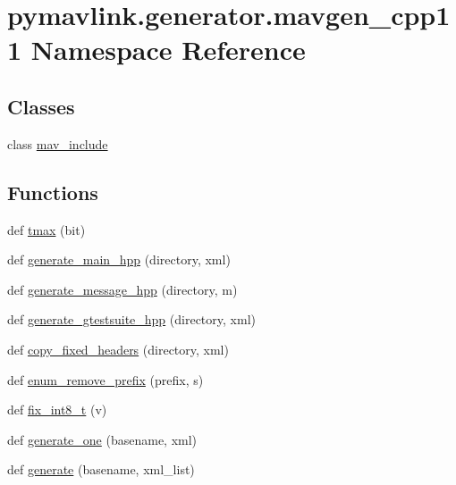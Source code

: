 \hypertarget{namespacepymavlink_1_1generator_1_1mavgen__cpp11}{}\section{pymavlink.\+generator.\+mavgen\+\_\+cpp11 Namespace Reference}
\label{namespacepymavlink_1_1generator_1_1mavgen__cpp11}
\subsection*{Classes}
\begin{DoxyCompactItemize}
\item 
class \mbox{\hyperlink{classpymavlink_1_1generator_1_1mavgen__cpp11_1_1mav__include}{mav\+\_\+include}}
\end{DoxyCompactItemize}
\subsection*{Functions}
\begin{DoxyCompactItemize}
\item 
def \mbox{\hyperlink{namespacepymavlink_1_1generator_1_1mavgen__cpp11_af2c11cc64c4dac58aa5a7dd8702a5edd}{tmax}} (bit)
\item 
def \mbox{\hyperlink{namespacepymavlink_1_1generator_1_1mavgen__cpp11_a8588e20abc9c34779923fda932483ace}{generate\+\_\+main\+\_\+hpp}} (directory, xml)
\item 
def \mbox{\hyperlink{namespacepymavlink_1_1generator_1_1mavgen__cpp11_a45ff369d71421e11a26c7a69c2f8de6c}{generate\+\_\+message\+\_\+hpp}} (directory, m)
\item 
def \mbox{\hyperlink{namespacepymavlink_1_1generator_1_1mavgen__cpp11_a1eb8c2ef48de5401c229cf9815761666}{generate\+\_\+gtestsuite\+\_\+hpp}} (directory, xml)
\item 
def \mbox{\hyperlink{namespacepymavlink_1_1generator_1_1mavgen__cpp11_a1780acf401220c5fc94513ec4e40fca4}{copy\+\_\+fixed\+\_\+headers}} (directory, xml)
\item 
def \mbox{\hyperlink{namespacepymavlink_1_1generator_1_1mavgen__cpp11_a62a78fb03297e16426b20e29b0f97332}{enum\+\_\+remove\+\_\+prefix}} (prefix, s)
\item 
def \mbox{\hyperlink{namespacepymavlink_1_1generator_1_1mavgen__cpp11_a73fbdce6f04ff5bff120f5c0aca0effb}{fix\+\_\+int8\+\_\+t}} (v)
\item 
def \mbox{\hyperlink{namespacepymavlink_1_1generator_1_1mavgen__cpp11_a64628a652f5243b623280750d9655f7e}{generate\+\_\+one}} (basename, xml)
\item 
def \mbox{\hyperlink{namespacepymavlink_1_1generator_1_1mavgen__cpp11_aa4f8d0bd184389b7d9c14bba66482add}{generate}} (basename, xml\+\_\+list)
\end{DoxyCompactItemize}

